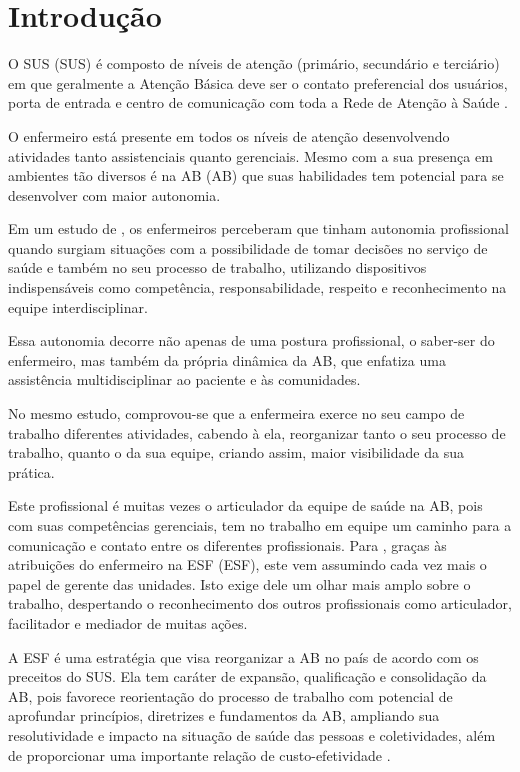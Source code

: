 \chapter{Introdução}
\label{cap:introducao}

O \acrlong{SUS} (\acrshort{SUS}) é composto de níveis de atenção (primário, secundário e terciário) em que geralmente a Atenção Básica deve ser o contato preferencial dos usuários, porta de entrada e centro de comunicação com toda a Rede de Atenção à Saúde .

O enfermeiro está presente em todos os  níveis de atenção desenvolvendo atividades tanto assistenciais quanto gerenciais. Mesmo com a sua presença em ambientes tão diversos é na \acrlong{AB} (\acrshort{AB}) que suas habilidades tem potencial para se desenvolver com maior autonomia. 

Em um estudo de , os enfermeiros perceberam que tinham autonomia profissional quando surgiam situações com a possibilidade de tomar decisões no serviço de saúde e também no seu processo de trabalho, utilizando dispositivos indispensáveis como competência, responsabilidade, respeito e reconhecimento na equipe interdisciplinar.

Essa autonomia decorre não apenas de uma postura profissional, o saber-ser do enfermeiro, mas também da própria dinâmica da \acrshort{AB}, que enfatiza uma assistência multidisciplinar ao paciente e às comunidades. 

No mesmo estudo, comprovou-se que a enfermeira exerce no seu campo de trabalho diferentes atividades, cabendo à ela, reorganizar tanto o seu processo de trabalho, quanto  o da sua equipe, criando assim, maior visibilidade da sua prática. 

Este profissional é muitas vezes o articulador da equipe de saúde na AB, pois com suas competências gerenciais, tem no trabalho em equipe um caminho para a comunicação e contato entre os diferentes profissionais. Para , graças às atribuições do enfermeiro na \acrlong{ESF} (\acrshort{ESF}), este vem assumindo cada vez mais o papel de gerente das unidades. Isto exige dele um olhar mais amplo sobre o trabalho, despertando o reconhecimento dos outros profissionais como articulador, facilitador e mediador de muitas ações. 

A \acrshort{ESF} é uma estratégia que visa reorganizar a \acrshort{AB} no país de acordo com os preceitos do \acrshort{SUS}. Ela tem caráter de expansão, qualificação e consolidação da \acrshort{AB}, pois favorece reorientação do processo de trabalho com potencial de aprofundar princípios, diretrizes e fundamentos da \acrshort{AB}, ampliando sua resolutividade e impacto na situação de saúde das pessoas e coletividades, além de proporcionar uma importante relação de custo-efetividade \cite{ministerio2012politica}.

